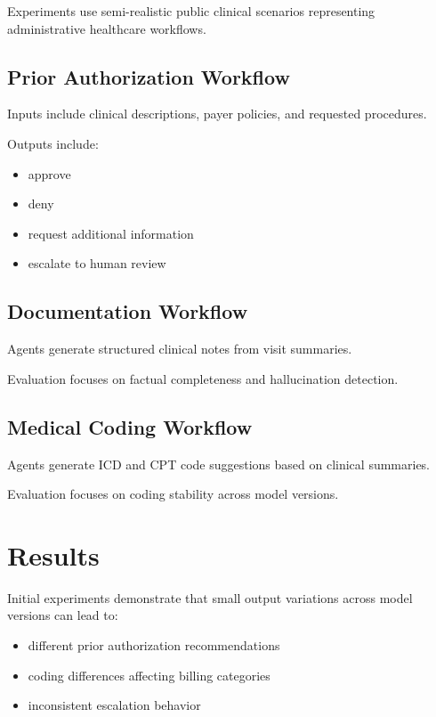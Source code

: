 \documentclass[11pt]{article}
\begin{document}
Experiments use semi-realistic public clinical scenarios representing administrative healthcare workflows.

\subsection{Prior Authorization Workflow}

Inputs include clinical descriptions, payer policies, and requested procedures.

Outputs include:

\begin{itemize}
\item approve
\item deny
\item request additional information
\item escalate to human review
\end{itemize}

\subsection{Documentation Workflow}

Agents generate structured clinical notes from visit summaries.

Evaluation focuses on factual completeness and hallucination detection.

\subsection{Medical Coding Workflow}

Agents generate ICD and CPT code suggestions based on clinical summaries.

Evaluation focuses on coding stability across model versions.

\section{Results}

Initial experiments demonstrate that small output variations across model versions can lead to:

\begin{itemize}
\item different prior authorization recommendations
\item coding differences affecting billing categories
\item inconsistent escalation behavior
\end{itemize}
\end{document}
